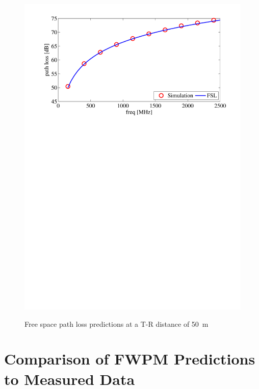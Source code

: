 \documentclass[10pt,journal,twoside]{IEEEtran}
\begin{document}
\begin{figure}
	\centering
	{\includegraphics[width=\linewidth]{path_loss_verification_50m}}
	\caption{Free space path loss predictions at a T-R distance of \SI{50}{m}}
	\label{fig:sim_fsl}
\end{figure} 
%
\section{Comparison of FWPM Predictions to Measured Data}\label{Comparison of FWPM Predictions to Measured Data}
%
\end{document}
